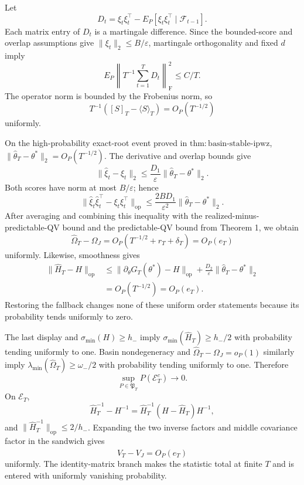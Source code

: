 Let
\[
 D_t=\xi_t\xi_t^\top-E_P[\xi_t\xi_t^\top\mid\mathcal F_{t-1}].
\]
Each matrix entry of \(D_t\) is a martingale difference. Since the bounded-score and overlap assumptions give \(\|\xi_t\|_2\le B/\varepsilon\), martingale orthogonality and fixed \(d\) imply
\[
 E_P\left\|T^{-1}\sum_{t=1}^TD_t\right\|_{\mathrm F}^2\le C/T.
\]
The operator norm is bounded by the Frobenius norm, so
\[
 T^{-1}([S]_T-\langle S\rangle_T)=O_P(T^{-1/2})
\]
uniformly.

On the high-probability exact-root event proved in \(\mathrm{thm:basin\text{-}stable\text{-}ipwz}\), \(\|\widehat\theta_T-\theta^*\|_2=O_P(T^{-1/2})\). The derivative and overlap bounds give
\[
 \|\widehat\xi_t-\xi_t\|_2
 \le\frac{D_1}{\varepsilon}\|\widehat\theta_T-\theta^*\|_2.
\]
Both scores have norm at most \(B/\varepsilon\); hence
\[
 \|\widehat\xi_t\widehat\xi_t^\top-\xi_t\xi_t^\top\|_{\mathrm{op}}
 \le\frac{2BD_1}{\varepsilon^2}\|\widehat\theta_T-\theta^*\|_2.
\]
After averaging and combining this inequality with the realized-minus-predictable-QV bound and the predictable-QV bound from Theorem 1, we obtain
\[
 \widehat\Omega_T-\Omega_J=O_P(T^{-1/2}+r_T+\delta_T)=O_P(e_T)
\]
uniformly. Likewise, smoothness gives
\[
\begin{aligned}
 \|\widehat H_T-H\|_{\mathrm{op}}
 &\le\|\partial_\theta G_T(\theta^*)-H\|_{\mathrm{op}}
 +\frac{D_2}{\varepsilon}\|\widehat\theta_T-\theta^*\|_2\\
 &=O_P(T^{-1/2})=O_P(e_T).
\end{aligned}
\]
Restoring the fallback changes none of these uniform order statements because its probability tends uniformly to zero.

The last display and \(\sigma_{\min}(H)\ge h_-\) imply \(\sigma_{\min}(\widehat H_T)\ge h_-/2\) with probability tending uniformly to one. Basin nondegeneracy and \(\widehat\Omega_T-\Omega_J=o_P(1)\) similarly imply \(\lambda_{\min}(\widehat\Omega_T)\ge\omega_-/2\) with probability tending uniformly to one. Therefore
\[
 \sup_{P\in\mathfrak P_T}P(\mathcal E_T^c)\longrightarrow0.
\]
On \(\mathcal E_T\),
\[
 \widehat H_T^{-1}-H^{-1}=\widehat H_T^{-1}(H-\widehat H_T)H^{-1},
\]
and \(\|\widehat H_T^{-1}\|_{\mathrm{op}}\le2/h_-\). Expanding the two inverse factors and middle covariance factor in the sandwich gives
\[
 \widehat V_T-V_J=O_P(e_T)
\]
uniformly. The identity-matrix branch makes the statistic total at finite \(T\) and is entered with uniformly vanishing probability.

